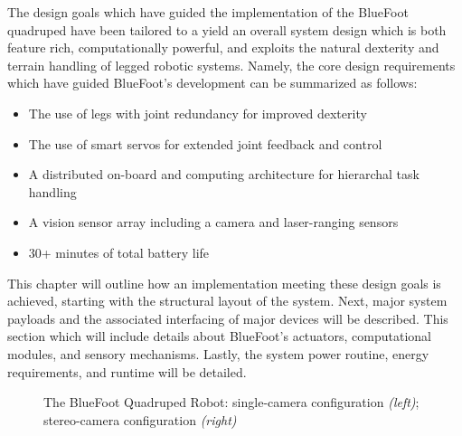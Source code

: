 	The design goals which have guided the implementation of the BlueFoot quadruped have been tailored to a yield an overall system design which is both feature rich, computationally powerful, and exploits the natural dexterity and terrain handling of legged robotic systems. Namely, the core design requirements which have guided BlueFoot's development can be summarized as follows:
		\begin{itemize}
			\item{The use of legs with joint redundancy for improved dexterity}
			\item{The use of smart servos for extended joint feedback and control}
			\item{A distributed on-board and computing architecture for hierarchal task handling}
			\item{A vision sensor array including a camera and laser-ranging sensors}
			\item{30+ minutes of total battery life}
		\end{itemize}
	
	This chapter will outline how an implementation meeting these design goals is achieved, starting with the structural layout of the system. Next, major system payloads and the associated interfacing of major devices will be described. This section which will include details about BlueFoot's actuators, computational modules, and sensory mechanisms. Lastly, the system power routine, energy requirements, and runtime will be detailed.

		\begin{figure}[h!]
			\centering
			\caption{The BlueFoot Quadruped Robot: single-camera configuration \emph{(left)}; stereo-camera configuration \emph{(right)}}
			\label{fig::bluefoot}
		\end{figure} 
	
